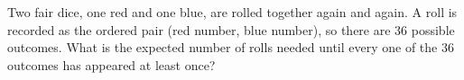 Two fair dice, one red and one blue, are rolled together again and again. A roll is recorded as the ordered pair (red number, blue number), so there are $36$ possible outcomes. What is the expected number of rolls needed until every one of the $36$ outcomes has appeared at least once?
